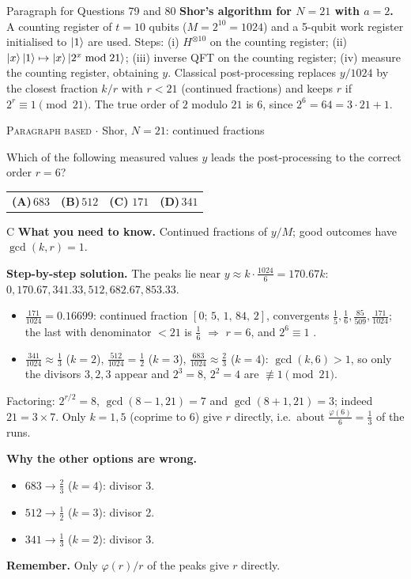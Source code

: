 \documentclass[11pt,a4paper]{article}
\newcommand{\optlabel}[1]{\textbf{(#1)}}
\newcommand{\correctlabel}[1]{\textcolor{okgreen}{\textbf{(#1)}\,\ding{51}}}
\newenvironment{qitem}[1]{\begin{list}{}{\setlength{\leftmargin}{3.3em}\setlength{\labelwidth}{3.1em}%
  \setlength{\labelsep}{0.2em}\setlength{\topsep}{3pt}\setlength{\parsep}{3pt}}\item[\textbf{Q.#1}\hfill]}{\end{list}}
\newcommand{\qsep}{\par\vspace{2pt}{\color{black!15}\hrule}\vspace{4pt}}
\newcommand{\qmeta}[2]{{\footnotesize\color{black!60}\textsc{#1} \;$\cdot$\; #2}\par}
\begin{document}
\begin{passagebox}{Paragraph for Questions 79 and 80}
\textbf{Shor's algorithm for $N = 21$ with $a = 2$.} A counting register of $t = 10$ qubits ($M = 2^{10} = 1024$) and a
5-qubit work register initialised to $\ket{1}$ are used. Steps: (i) $H^{\otimes 10}$ on the counting register;
(ii) $\ket{x}\ket{1} \mapsto \ket{x}\ket{2^x \bmod 21}$; (iii) inverse QFT on the counting register; (iv) measure the counting
register, obtaining $y$. Classical post-processing replaces $y/1024$ by the closest fraction $k/r$ with $r < 21$ (continued
fractions) and keeps $r$ if $2^r \equiv 1 \pmod{21}$. The true order of $2$ modulo $21$ is $6$, since $2^6 = 64 = 3\cdot21 + 1$.
\end{passagebox}
\begin{qitem}{79}
\qmeta{Paragraph based}{Shor, $N = 21$: continued fractions}
Which of the following measured values $y$ leads the post-processing to the correct order $r = 6$?
\par\smallskip\noindent\begin{tabularx}{\linewidth}{@{}*{4}{L}@{}}
\optlabel{A}\,$683$ & \optlabel{B}\,$512$ & \correctlabel{C}\,$171$ & \optlabel{D}\,$341$
\end{tabularx}
\end{qitem}
\begin{solbox}{C}
\textbf{\color{brand}What you need to know.} Continued fractions of $y/M$; good outcomes have $\gcd(k, r) = 1$.

\textbf{\color{brand}Step-by-step solution.} The peaks lie near $y \approx k\cdot\frac{1024}{6} = 170.67k$: $0, 170.67, 341.33, 512, 682.67, 853.33$.
\begin{itemize}\itemsep0pt
\item $\frac{171}{1024} = 0.16699$: continued fraction $[0;\,5,\,1,\,84,\,2]$, convergents $\frac15, \frac16, \frac{85}{509}, \frac{171}{1024}$; the last with
      denominator $< 21$ is $\frac16$ $\Rightarrow$ $r = 6$, and $2^6 \equiv 1$ \checkmark.
\item $\frac{341}{1024} \approx \frac13$ ($k = 2$), $\frac{512}{1024} = \frac12$ ($k = 3$), $\frac{683}{1024} \approx \frac23$ ($k = 4$): $\gcd(k, 6) > 1$,
      so only the divisors $3, 2, 3$ appear and $2^3 = 8$, $2^2 = 4$ are $\not\equiv 1 \pmod{21}$.
\end{itemize}
Factoring: $2^{r/2} = 8$, $\gcd(8 - 1, 21) = 7$ and $\gcd(8 + 1, 21) = 3$; indeed $21 = 3\times7$. Only $k = 1, 5$ (coprime to 6)
give $r$ directly, i.e.\ about $\frac{\varphi(6)}{6} = \frac13$ of the runs.

\textbf{\color{brand}Why the other options are wrong.}
\begin{itemize}[leftmargin=2.4em, itemsep=1pt, topsep=2pt]
\item[\textbf{(A)}] $683 \to \frac23$ ($k = 4$): divisor 3.
\item[\textbf{(B)}] $512 \to \frac12$ ($k = 3$): divisor 2.
\item[\textbf{(D)}] $341 \to \frac13$ ($k = 2$): divisor 3.
\end{itemize}
\textbf{\color{brand}Remember.} Only $\varphi(r)/r$ of the peaks give $r$ directly.
\end{solbox}
\qsep
\end{document}
